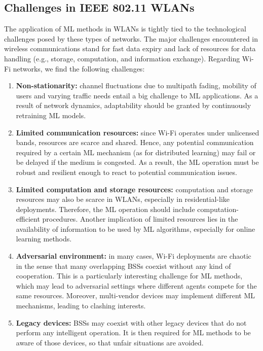 \documentclass[journal]{IEEEtran}
\begin{document}
\subsection{Challenges in IEEE 802.11 WLANs}
\label{section:ieee_80211_wlans}
The application of ML methods in WLANs is tightly tied to the technological challenges posed by these types of networks. The major challenges encountered in wireless communications stand for fast data expiry and lack of resources for data handling (e.g., storage, computation, and information exchange). Regarding Wi-Fi networks, we find the following challenges:
\begin{enumerate}
	\item \textbf{Non-stationarity:} channel fluctuations due to multipath fading, mobility of users and varying traffic needs entail a big challenge to ML applications. As a result of network dynamics, adaptability should be granted by continuously retraining ML models.
	\item \textbf{Limited communication resources:} since Wi-Fi operates under unlicensed bands, resources are scarce and shared. Hence, any potential communication required by a certain ML mechanism (as for distributed learning) may fail or be delayed if the medium is congested. As a result, the ML operation must be robust and resilient enough to react to potential communication issues.
	\item \textbf{Limited computation and storage resources:} computation and storage resources may also be scarce in WLANs, especially in residential-like deployments. Therefore, the ML operation should include computation-efficient procedures. Another implication of limited resources lies in the availability of information to be used by ML algorithms, especially for online learning methods.
	\item \textbf{Adversarial environment:} in many cases, Wi-Fi deployments are chaotic in the sense that many overlapping BSSs coexist without any kind of cooperation. This is a particularly interesting challenge for ML methods, which may lead to adversarial settings where different agents compete for the same resources. Moreover, multi-vendor devices may implement different ML mechanisms, leading to clashing interests.
	\item \textbf{Legacy devices:} BSSs may coexist with other legacy devices that do not perform any intelligent operation. It is then required for ML methods to be aware of those devices, so that unfair situations are avoided.
\end{enumerate}
\end{document}
